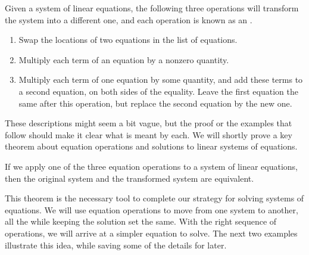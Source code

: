 \documentclass{ximera}
\begin{document}
\begin{definition}
  Given a system of linear equations, the following three operations will transform the system into a different one, and each operation is known as an .
  \begin{enumerate}
  \item Swap the locations of two equations in the list of equations.
  \item Multiply each term of an equation by a nonzero quantity.
  \item Multiply each term of one equation by some quantity, and add these terms to a second equation, on both sides of the equality.  Leave the first equation the same after this operation, but replace the second equation by the new one.
  \end{enumerate}
\end{definition}

These descriptions might seem a bit vague, but the proof or the
examples that follow should make it clear what is meant by each.  We
will shortly prove a key theorem about equation operations and
solutions to linear systems of equations.

\begin{theorem}
  If we apply one of the three equation operations to a system of
  linear equations, then the original system and the transformed
  system are equivalent.
\end{theorem}

This theorem is the necessary tool to complete our strategy for
solving systems of equations.  We will use equation operations to move
from one system to another, all the while keeping the solution set the
same.  With the right sequence of operations, we will arrive at a
simpler equation to solve.  The next two examples illustrate this
idea, while saving some of the details for later.
\end{document}
